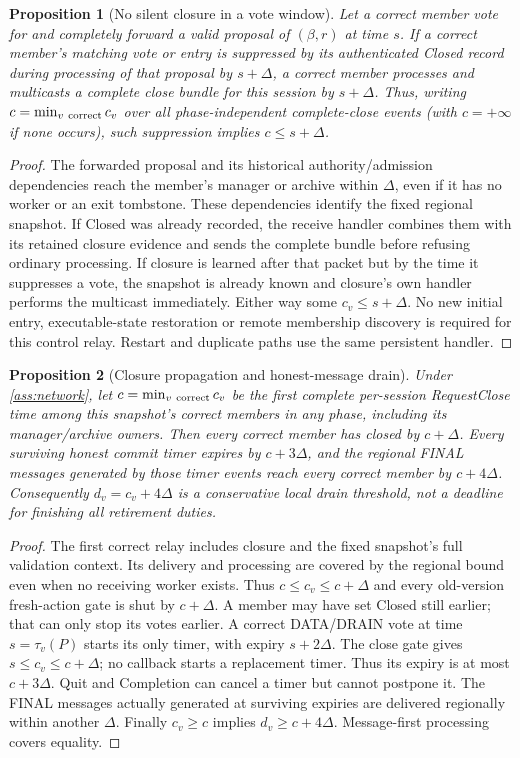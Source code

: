 \documentclass[11pt,a4paper]{article}
\newtheorem{proposition}[proposition]{Proposition}
\begin{document}
\begin{proposition}[No silent closure in a vote window]
\label{prop:retirement-observable-close}
Let a correct member vote for and completely forward a valid proposal
of $(\beta,r)$ at time $s$. If a correct member's matching vote or entry
is suppressed by its authenticated Closed record during processing of
that proposal by $s+\Delta$, a correct member processes and multicasts
a complete close bundle for this session by $s+\Delta$. Thus, writing
$c=\min_{v\ {\rm correct}}c_v$ over all phase-independent complete-close
events (with $c=+\infty$ if none occurs), such suppression implies
$c\le s+\Delta$.
\end{proposition}
\begin{proof}
The forwarded proposal and its historical authority/admission dependencies
reach the member's manager or archive within $\Delta$, even if it has
no worker or an exit tombstone. These dependencies identify the fixed
regional snapshot. If Closed was already recorded, the receive handler
combines them with its retained closure evidence and sends the complete
bundle before refusing ordinary processing. If closure is learned after
that packet but by the time it suppresses a vote, the snapshot is already
known and closure's own handler performs the multicast immediately.
Either way some $c_v\le s+\Delta$. No new initial entry, executable-state
restoration or remote membership discovery is required for this control
relay. Restart and duplicate paths use the same persistent handler.
\end{proof}

\begin{proposition}[Closure propagation and honest-message drain]
\label{prop:retirement-drain}
Under \cref{ass:network}, let $c=\min_{v\ {\rm correct}}c_v$ be the first
complete per-session RequestClose time among this snapshot's correct
members in any phase, including its manager/archive owners. Then every correct member has closed by $c+\Delta$.
Every surviving honest commit timer expires by $c+3\Delta$, and the
regional FINAL messages generated by those timer events reach every
correct member by $c+4\Delta$. Consequently $d_v=c_v+4\Delta$ is a
conservative local drain threshold, not a deadline for finishing all
retirement duties.
\end{proposition}
\begin{proof}
The first correct relay includes closure and the fixed snapshot's full
validation context. Its delivery and processing are covered by the
regional bound even when no receiving worker exists. Thus
$c\le c_v\le c+\Delta$ and every old-version fresh-action gate is shut
by $c+\Delta$. A member may have set Closed still earlier; that can only
stop its votes earlier. A correct DATA/DRAIN vote at time
$s=\tau_v(P)$ starts its only timer, with expiry $s+2\Delta$.
The close gate gives $s\le c_v\le c+\Delta$; no callback starts a
replacement timer. Thus its expiry is at most $c+3\Delta$.
Quit and Completion can cancel a timer but cannot postpone it.
The FINAL messages actually generated at surviving expiries are
delivered regionally within another $\Delta$. Finally $c_v\ge c$
implies $d_v\ge c+4\Delta$. Message-first processing covers equality.
\end{proof}
\end{document}
